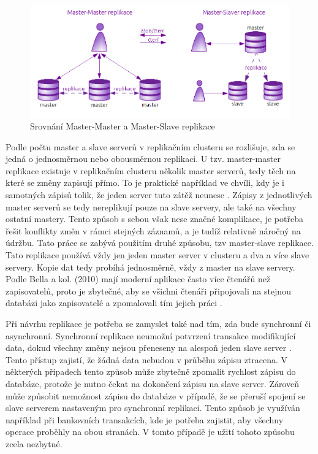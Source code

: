           \begin{figure}[H]
            \centering
            \includegraphics[scale=1]{../../../grafy/obr/schema_masterMasterSlave.png}
            \caption {Srovnání Master-Master a Master-Slave replikace}
            \label{srovnaniM-M-S}
          \end{figure}

Podle počtu master a slave serverů v replikačním clusteru se rozlišuje, zda se jedná o jednosměrnou nebo obousměrnou replikaci. U tzv. master-master replikace existuje v replikačním clusteru několik master serverů, tedy těch na které se změny zapisují přímo. To je praktické například ve chvíli, kdy je i samotných zápisů tolik, že jeden server tuto zátěž neunese . Zápisy z jednotlivých master serverů se tedy nereplikují pouze na slave servery, ale také na všechny ostatní mastery. Tento způsob s sebou však nese značné komplikace, je potřeba řešit konflikty změn v rámci stejných záznamů, a je tudíž relativně náročný na údržbu. Tato práce se zabývá použitím druhé způsobu, tzv master-slave replikace. Tato replikace používá vždy jen jeden master server v clusteru a dva a více slave servery. Kopie dat tedy probíhá jednosměrně, vždy z master na slave servery. Podle Bella a kol. (2010) mají moderní aplikace často více čtenářů než zapisovatelů, proto je zbytečné, aby se všichni čtenáři připojovali na stejnou databázi jako zapisovatelé a zpomalovali tím jejich práci \citep{BellKindahlThalmann2010}.

Při návrhu replikace je potřeba se zamyslet také nad tím, zda bude synchronní či asynchronní. Synchronní replikace neumožní potvrzení transakce modifikující data, dokud všechny změny nejsou přeneseny na alespoň jeden slave server \citep{Boszormenyi2013}. Tento přístup zajistí, že žádná data nebudou v průběhu zápisu ztracena. V některých případech tento způsob může zbytečně zpomalit rychlost zápisu do databáze, protože je nutno čekat na dokončení zápisu na slave server. Zároveň může způsobit nemožnost zápisu do databáze v případě, že se přeruší spojení se slave serverem nastaveným pro synchronní replikaci. Tento způsob je využíván například při bankovních transakcích, kde je potřeba zajistit, aby všechny operace proběhly na obou stranách. V tomto případě je užití tohoto způsobu zcela nezbytné. 

